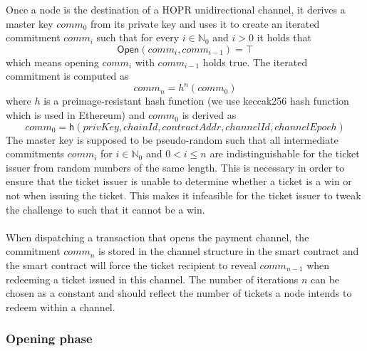 Once a node is the destination of a HOPR unidirectional channel, it derives a master key $comm_0$ from its private key and uses it to create an iterated commitment $comm_i$ such that for every $i \in \mathbb{N}_0$ and $i > 0$ it holds that $$ \mathsf{Open}(comm_{i}, comm_{i-1}) = \top $$
which means opening $comm_{i}$ with $comm_{i-1}$ holds true.
The iterated commitment is computed as $$comm_n = h^n(comm_0)$$ where $h$ is a preimage-resistant hash function (we use keccak256 hash function which is used in Ethereum) and $comm_0$ is derived as 
$$ comm_0 = \mathsf{h}(privKey,chainId, contractAddr, channelId, channelEpoch)$$
The master key is supposed to be pseudo-random such that all intermediate commitments $comm_{i}$ for $i \in \mathbb{N}_0$ and $0 < i \le n$ are indistinguishable for the ticket issuer from random numbers of the same length. This is necessary in order to ensure that the ticket issuer is unable to determine whether a ticket is a win or not when issuing the ticket. This makes it infeasible for the ticket issuer to tweak the challenge to such that it cannot be a win.
\\~\\When dispatching a transaction that opens the payment channel, the commitment $comm_n$ is stored in the channel structure in the smart contract and the smart contract will force the ticket recipient to reveal $comm_{n-1}$ when redeeming a ticket issued in this channel.
The number of iterations $n$ can be chosen as a constant and should reflect the number of tickets a node intends to redeem within a channel.

\subsubsection{Opening phase}

